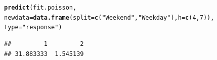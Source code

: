 \documentclass[10pt]{article}\usepackage[]{graphicx}\usepackage[]{color}
\makeatletter
\newcommand{\hlnum}[1]{\textcolor[rgb]{0.686,0.059,0.569}{#1}}%
\newcommand{\hlstr}[1]{\textcolor[rgb]{0.192,0.494,0.8}{#1}}%
\newcommand{\hlstd}[1]{\textcolor[rgb]{0.345,0.345,0.345}{#1}}%
\newcommand{\hlkwc}[1]{\textcolor[rgb]{0.333,0.667,0.333}{#1}}%
\newcommand{\hlkwd}[1]{\textcolor[rgb]{0.737,0.353,0.396}{\textbf{#1}}}%
\newenvironment{kframe}{%
 \def\at@end@of@kframe{}%
 \ifinner\ifhmode%
  \def\at@end@of@kframe{\end{minipage}}%
  \begin{minipage}{\columnwidth}%
 \fi\fi%
 \def\FrameCommand##1{\hskip\@totalleftmargin \hskip-\fboxsep
 \colorbox{shadecolor}{##1}\hskip-\fboxsep
     \hskip-\linewidth \hskip-\@totalleftmargin \hskip\columnwidth}%
 \MakeFramed {\advance\hsize-\width
   \@totalleftmargin\z@ \linewidth\hsize
   \@setminipage}}%
 {\par\unskip\endMakeFramed%
 \at@end@of@kframe}
\newenvironment{knitrout}{}{} %
\makeatother
\begin{document}
\begin{knitrout}\small
{}\color{fgcolor}\begin{kframe}
\begin{alltt}
\hlkwd{predict}\hlstd{(fit.poisson,}
  \hlkwc{newdata}\hlstd{=}\hlkwd{data.frame}\hlstd{(}\hlkwc{split}\hlstd{=}\hlkwd{c}\hlstd{(}\hlstr{"Weekend"}\hlstd{,}\hlstr{"Weekday"}\hlstd{),}\hlkwc{h}\hlstd{=}\hlkwd{c}\hlstd{(}\hlnum{4}\hlstd{,}\hlnum{7}\hlstd{)),}
  \hlkwc{type}\hlstd{=}\hlstr{"response"}\hlstd{)}
\end{alltt}
\begin{verbatim}
##         1         2 
## 31.883333  1.545139
\end{verbatim}
\end{kframe}
\end{knitrout}
\end{document}

